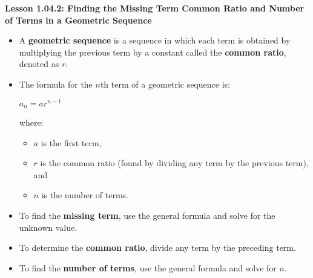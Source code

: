 \begin{center}
\textbf{Lesson 1.04.2: Finding the Missing Term Common Ratio and Number of Terms in a Geometric Sequence}
\end{center}

\vspace*{-1.5ex}

\begin{itemize}
    \item A \textbf{geometric sequence} is a sequence in which each term is obtained by multiplying the previous term by a constant called the \textbf{common ratio}, denoted as $r$.
    \item The formula for the $n$th term of a geometric sequence is:

{\centering $  a_n = a r^{n-1}  $\par}
    where:
    \begin{itemize}
        \item $a$ is the first term,
        \item $r$ is the common ratio (found by dividing any term by the previous term), and
        \item $n$ is the number of terms.
    \end{itemize}
    \item To find the \textbf{missing term}, use the general formula and solve for the unknown value.
    \item To determine the \textbf{common ratio}, divide any term by the preceding term.
    \item To find the \textbf{number of terms}, use the general formula and solve for $n$.
\end{itemize}
